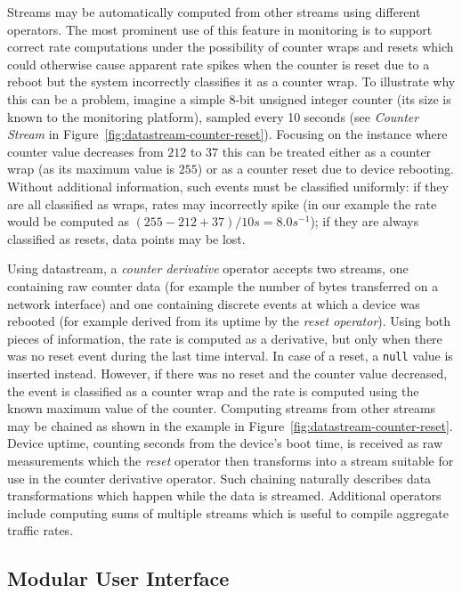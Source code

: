 \documentclass[5p,sort&compress]{elsarticle}
\begin{document}
Streams may be automatically computed from other streams using different operators.
The most prominent use of this feature in monitoring is to support correct rate computations under the possibility of counter wraps and resets which could otherwise cause apparent rate spikes when the counter is reset due to a reboot but the system incorrectly classifies it as a counter wrap.
To illustrate why this can be a problem, imagine a simple 8-bit unsigned integer counter (its size is known to the monitoring platform), sampled every 10 seconds (see \textit{Counter Stream} in Figure~\ref{fig:datastream-counter-reset}).
Focusing on the instance where counter value decreases from $212$ to $37$ this can be treated either as a counter wrap (as its maximum value is $255$) or as a counter reset due to device rebooting.
Without additional information, such events must be classified uniformly: if they are all classified as wraps, rates may incorrectly spike (in our example the rate would be computed as $(255 - 212 + 37) / 10s = 8.0s^{-1}$); if they are always classified as resets, data points may be lost.

Using datastream, a \textit{counter derivative} operator accepts two streams, one containing raw counter data (for example the number of bytes transferred on a network interface) and one containing discrete events at which a device was rebooted (for example derived from its uptime by the \textit{reset operator}).
Using both pieces of information, the rate is computed as a derivative, but only when there was no reset event during the last time interval.
In case of a reset, a \texttt{null} value is inserted instead.
However, if there was no reset and the counter value decreased, the event is classified as a counter wrap and the rate is computed using the known maximum value of the counter.
Computing streams from other streams may be chained as shown in the example in Figure~\ref{fig:datastream-counter-reset}.
Device uptime, counting seconds from the device's boot time, is received as raw measurements which the \textit{reset} operator then transforms into a stream suitable for use in the counter derivative operator.
Such chaining naturally describes data transformations which happen while the data is streamed.
Additional operators include computing sums of multiple streams which is useful to compile aggregate traffic rates.

\subsection{Modular User Interface}
\end{document}
